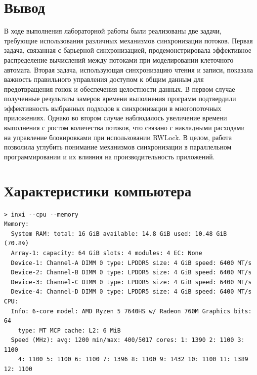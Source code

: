\documentclass[a4paper, 14pt]{extarticle}
\begin{document}
\section*{Вывод}\label{Sect::conclusion}

В ходе выполнения лабораторной работы были реализованы две задачи, требующие использования различных механизмов синхронизации потоков. Первая задача, связанная с барьерной синхронизацией, продемонстрировала эффективное распределение вычислений между потоками при моделировании клеточного автомата. Вторая задача, использующая синхронизацию чтения и записи, показала важность правильного управления доступом к общим данным для предотвращения гонок и обеспечения целостности данных. В первом случае полученные результаты замеров времени выполнения программ подтвердили эффективность выбранных подходов к синхронизации в многопоточных приложениях. Однако во втором случае наблюдалось увеличение времени выполнения с ростом количества потоков, что связано с накладными расходами на управление блокировками при использовании RWLock. В целом, работа позволила углубить понимание механизмов синхронизации в параллельном программировании и их влияния на производительность приложений.

\section*{Характеристики компьютера}

\begin{lstlisting}[caption={Характеристики компьютера}, label={lst:computer_specs}]
> inxi --cpu --memory
Memory:
  System RAM: total: 16 GiB available: 14.8 GiB used: 10.48 GiB (70.8%)
  Array-1: capacity: 64 GiB slots: 4 modules: 4 EC: None
  Device-1: Channel-A DIMM 0 type: LPDDR5 size: 4 GiB speed: 6400 MT/s
  Device-2: Channel-B DIMM 0 type: LPDDR5 size: 4 GiB speed: 6400 MT/s
  Device-3: Channel-C DIMM 0 type: LPDDR5 size: 4 GiB speed: 6400 MT/s
  Device-4: Channel-D DIMM 0 type: LPDDR5 size: 4 GiB speed: 6400 MT/s
CPU:
  Info: 6-core model: AMD Ryzen 5 7640HS w/ Radeon 760M Graphics bits: 64
    type: MT MCP cache: L2: 6 MiB
  Speed (MHz): avg: 1200 min/max: 400/5017 cores: 1: 1390 2: 1100 3: 1100
    4: 1100 5: 1100 6: 1100 7: 1396 8: 1100 9: 1432 10: 1100 11: 1389 12: 1100
\end{lstlisting}
\end{document}
